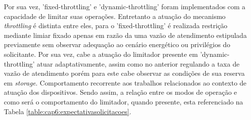 Por sua vez, 'fixed-throttling'  e 'dynamic-throttling' foram implementados com a capacidade de limitar suas operações. Entretanto a atuação do mecanismo \textit{throttling} é distinta entre eles, para o 'fixed-throttling' é realizada restrição mediante limiar fixado apenas em razão da uma vazão de atendimento estipulada previamente sem observar adequação ao cenário energético ou privilégios do solicitante. Por sua vez, cabe a atuação do limitador presente em 'dynamic-throttling' atuar adaptativamente, assim como no anterior regulando a taxa de vazão de atendimento porém para este cabe observar as condições de sua reserva em \textit{storage}. Comportamento recorrente aos trabalhos relacionados ao contexto de atuação dos dispositivos. Sendo assim, a relação entre os modos de operação e como será o comportamento do limitador, quando presente, esta referenciado na Tabela \ref{table:cap6:expectativasolicitacoes}.

